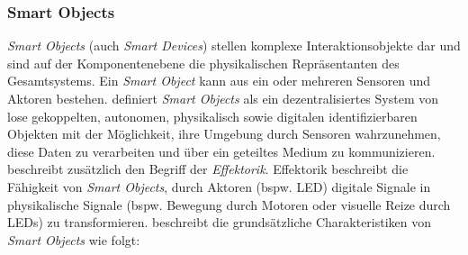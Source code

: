 \subsubsection{Smart Objects} \label{subsubsec:smartObjects}
\textit{Smart Objects} (auch \textit{Smart Devices}) stellen komplexe Interaktionsobjekte dar und sind auf der Komponentenebene die physikalischen Repräsentanten des Gesamtsystems. Ein \textit{Smart Object} kann aus ein oder mehreren Sensoren und Aktoren bestehen. \cite{Kortuem2010Smart} definiert \textit{Smart Objects} als ein dezentralisiertes System von lose gekoppelten, autonomen, physikalisch sowie digitalen identifizierbaren Objekten mit der Möglichkeit, ihre Umgebung durch Sensoren wahrzunehmen, diese Daten zu verarbeiten und über ein geteiltes Medium zu kommunizieren. \cite{mattern2010internet} beschreibt zusätzlich den Begriff der \textit{Effektorik}. Effektorik beschreibt die Fähigkeit von \textit{Smart Objects}, durch Aktoren (bspw. LED) digitale Signale in physikalische Signale (bspw. Bewegung durch Motoren oder visuelle Reize durch LEDs) zu transformieren. \cite{Kortuem2010Smart} beschreibt die grundsätzliche Charakteristiken von \textit{Smart Objects} wie folgt:
